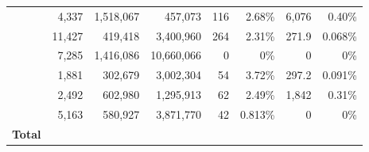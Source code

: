 \begin{table}[tb]
\begin{tabular}{|lrrr||rr||rr|}
		\hline\hline
		\vre                                  & 4,337                                         & 1,518,067       & 457,073                  & 116                    & 2.68\%                     & 6,076           & 0.40\% \bigstrut[t]              \\
		\vue                                  & 11,427                                        & 419,418         & 3,400,960                & 264                    & 2.31\%                     & 271.9           & 0.068\%                          \\
		\vle                                  & 7,285                                         & 1,416,086       & 10,660,066               & 0                      & 0\%                        & 0               & 0\%                              \\
		\vto                                  & 1,881                                         & 302,679         & 3,002,304                & 54                     & 3.72\%                     & 297.2           & 0.091\%                          \\
		\vio                                  & 2,492                                         & 602,980         & 1,295,913                & 62                     & 2.49\%                     & 1,842           & 0.31\%                           \\
		\vua                                  & 5,163                                         & 580,927         & 3,871,770                & 42                     & 0.813\%                    & 0               & 0\%                              \\
		\hline
		\bf Total                             & \VulnerableContracts                          & \EtherStake     & \NumAnalyzedTransactions & \NumExploitedContracts & \PercentExploitedContracts & \ExploitedEther & \PercentExploitedEther \bigstrut \\
		\hline
	\end{tabular}
\end{table}
